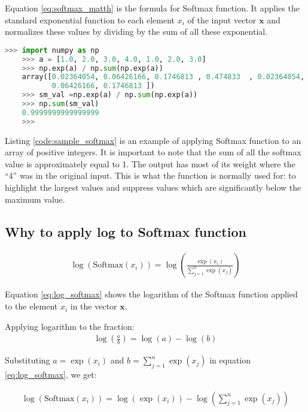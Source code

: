 Equation \ref{eq:softmax_matth} is the formula for Softmax function. It applies the standard exponential function to each element $ x_i $ of the input vector $ \mathbf{x} $  and normalizes these values by dividing by the sum of all these exponential. 

\begin{lstlisting}[language=Python,caption={Python example for softmax},label=code:sample_softmax]
    >>> import numpy as np
    >>> a = [1.0, 2.0, 3.0, 4.0, 1.0, 2.0, 3.0]
    >>> np.exp(a) / np.sum(np.exp(a))
    array([0.02364054, 0.06426166, 0.1746813 , 0.474833  , 0.02364054,
           0.06426166, 0.1746813 ])
    >>> sm_val =np.exp(a) / np.sum(np.exp(a))
    >>> np.sum(sm_val)
    0.9999999999999999
    >>>
\end{lstlisting}

Listing \ref{code:sample_softmax} is an example of applying Softmax function to an array of positive integers. It is important to note that the sum of all the softmax value is approximately equal to 1.  The output has most of its weight where the ``4'' was in the original input. This is what the function is normally used for: to highlight the largest values and suppress values which are significantly below the maximum value.



\subsection*{Why to apply log to Softmax function } \label{sec:Logsoft}

 
\begin{align}
    \log(\text{Softmax}(x_i)) = \log\left(\frac{{\exp(x_i)}}{{\sum_{j=1}^n \exp(x_j)}}\right) \label{eq:log_softmax}
\end{align}

Equation \eqref{eq:log_softmax} shows the logarithm of the Softmax function applied to the element \(x_i\) in the vector \(\mathbf{x}\). 

Applying logarithm to the fraction: 
\begin{align}
    \log\left(\frac{a}{b}\right) = \log(a) - \log(b)
\end{align}

Substituting \(a = \exp(x_i)\) and \(b = \sum_{j=1}^n \exp(x_j)\) in equation \eqref{eq:log_softmax}, we get:

\begin{align}
    \log(\text{Softmax}(x_i)) = \log(\exp(x_i)) - \log\left(\sum_{j=1}^n \exp(x_j)\right)
\end{align}

